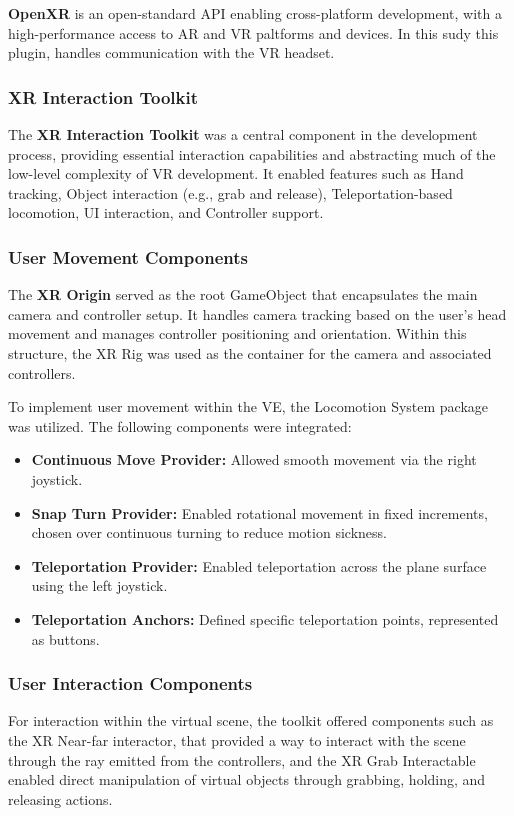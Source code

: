 \textbf{OpenXR} is an open-standard \gls{API} enabling cross-platform development, with a high-performance access to AR and VR paltforms and devices. In this sudy this plugin, handles communication with the \gls{VR} headset.

\subsubsection{XR Interaction Toolkit}
The \textbf{XR Interaction Toolkit} was a central component in the development process, providing essential interaction capabilities and abstracting much of the low-level complexity of \gls{VR} development. It enabled features such as Hand tracking, 
Object interaction (e.g., grab and release), Teleportation-based locomotion, \gls{UI} interaction, and Controller support.

\subsubsection{User Movement Components}
The \textbf{XR Origin} served as the root GameObject that encapsulates the main camera and controller setup. 
It handles camera tracking based on the user's head movement and manages controller positioning and orientation. 
Within this structure, the XR Rig was used as the container for the camera and associated controllers.

To implement user movement within the \gls{VE}, the Locomotion System package was utilized. The following components were integrated: 

\begin{itemize}
\item{\textbf{Continuous Move Provider:}  Allowed smooth movement via the right joystick.}
\item{\textbf{Snap Turn Provider:}  Enabled rotational movement in fixed increments, chosen over continuous turning to reduce motion sickness.}
\item{\textbf{Teleportation Provider:} Enabled teleportation across the plane surface using the left joystick.}
\item{\textbf{Teleportation Anchors:} Defined specific teleportation points, represented as buttons.}
\end{itemize}

\subsubsection{User Interaction Components}
For interaction within the virtual scene, the toolkit offered components such as the XR Near-far interactor, that provided a way to interact with the scene through the ray emitted from the controllers, and the XR Grab Interactable enabled direct manipulation of virtual objects through grabbing, holding, and releasing actions.

